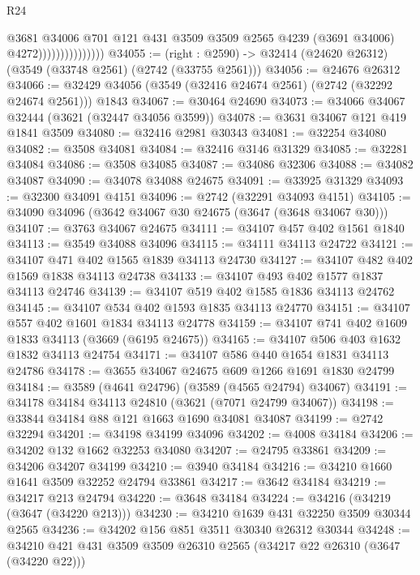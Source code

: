 \begin{lexlean}{R24}
\begin{coremodule}
                                @3681
                                  @34006
                                  @701
                                  @121
                                  @431
                                  @3509
                                  @3509
                                  @2565
                                  @4239
                                  (@3691 @34006)
                                  @4272)))))))))))))))
@34055 := (right : @2590) -> @32414 (@24620 @26312) (@3549 (@33748 @2561) (@2742 (@33755 @2561)))
@34056 := @24676 @26312
@34066 := @32429 @34056 (@3549 (@32416 @24674 @2561) (@2742 (@32292 @24674 @2561))) @1843
@34067 := @30464 @24690
@34073 := @34066 @34067 @32444 (@3621 (@32447 @34056 @3599))
@34078 := @3631 @34067 @121 @419 @1841 @3509
@34080 := @32416 @2981 @30343
@34081 := @32254 @34080
@34082 := @3508 @34081
@34084 := @32416 @3146 @31329
@34085 := @32281 @34084
@34086 := @3508 @34085
@34087 := @34086 @32306
@34088 := @34082 @34087
@34090 := @34078 @34088 @24675
@34091 := @33925 @31329
@34093 := @32300 @34091 @4151
@34096 := @2742 (@32291 @34093 @4151)
@34105 := @34090 @34096 (@3642 @34067 @30 @24675 (@3647 (@3648 @34067 @30)))
@34107 := @3763 @34067 @24675
@34111 := @34107 @457 @402 @1561 @1840
@34113 := @3549 @34088 @34096
@34115 := @34111 @34113 @24722
@34121 := @34107 @471 @402 @1565 @1839 @34113 @24730
@34127 := @34107 @482 @402 @1569 @1838 @34113 @24738
@34133 := @34107 @493 @402 @1577 @1837 @34113 @24746
@34139 := @34107 @519 @402 @1585 @1836 @34113 @24762
@34145 := @34107 @534 @402 @1593 @1835 @34113 @24770
@34151 := @34107 @557 @402 @1601 @1834 @34113 @24778
@34159 := @34107 @741 @402 @1609 @1833 @34113 (@3669 (@6195 @24675))
@34165 := @34107 @506 @403 @1632 @1832 @34113 @24754
@34171 := @34107 @586 @440 @1654 @1831 @34113 @24786
@34178 := @3655 @34067 @24675 @609 @1266 @1691 @1830 @24799
@34184 := @3589 (@4641 @24796) (@3589 (@4565 @24794) @34067)
@34191 := @34178 @34184 @34113 @24810 (@3621 (@7071 @24799 @34067))
@34198 := @33844 @34184 @88 @121 @1663 @1690 @34081 @34087
@34199 := @2742 @32294
@34201 := @34198 @34199 @34096
@34202 := @4008 @34184
@34206 := @34202 @132 @1662 @32253 @34080
@34207 := @24795 @33861
@34209 := @34206 @34207 @34199
@34210 := @3940 @34184
@34216 := @34210 @1660 @1641 @3509 @32252 @24794 @33861
@34217 := @3642 @34184
@34219 := @34217 @213 @24794
@34220 := @3648 @34184
@34224 := @34216 (@34219 (@3647 (@34220 @213)))
@34230 := @34210 @1639 @431 @32250 @3509 @30344 @2565
@34236 := @34202 @156 @851 @3511 @30340 @26312 @30344
@34248 := @34210 @421 @431 @3509 @3509 @26310 @2565 (@34217 @22 @26310 (@3647 (@34220 @22)))

\end{coremodule}
\end{lexlean}
